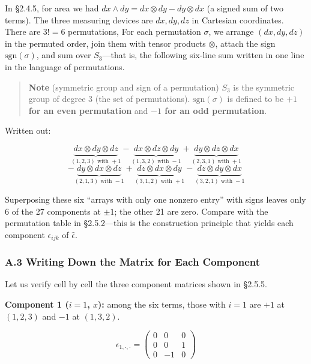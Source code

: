 \documentclass[a4paper,12pt,openany]{book}
\begin{document}
In §2.4.5, for area we had
\(dx \wedge dy = dx \otimes dy - dy \otimes dx\) (a signed sum of two
terms). The three measuring devices are \(dx, dy, dz\) in Cartesian
coordinates. There are \(3! = 6\) permutations, For each permutation
\(\sigma\), we arrange \((dx,dy,dz)\) in the permuted order, join them
with tensor products \(\otimes\), attach the sign
\(\mathrm{sgn}(\sigma)\), and sum over \(S_3\)—that is, the following
six-line sum written in one line in the language of permutations.

\begin{quote}
\textbf{Note} (symmetric group and sign of a permutation) \(S_3\) is the
symmetric group of degree 3 (the set of permutations).
\(\mathrm{sgn}(\sigma)\) is defined to be
\textbf{$+1$ for an even permutation} and
\textbf{$-1$ for an odd permutation}.
\end{quote}

Written out:

\[\underbrace{dx \otimes dy \otimes dz}_{(1,2,3)\text{ with }+1} - \underbrace{dx \otimes dz \otimes dy}_{(1,3,2)\text{ with }-1} + \underbrace{dy \otimes dz \otimes dx}_{(2,3,1)\text{ with }+1}\]
\[- \underbrace{dy \otimes dx \otimes dz}_{(2,1,3)\text{ with }-1} + \underbrace{dz \otimes dx \otimes dy}_{(3,1,2)\text{ with }+1} - \underbrace{dz \otimes dy \otimes dx}_{(3,2,1)\text{ with }-1}\]

Superposing these six ``arrays with only one nonzero entry'' with signs
leaves only 6 of the 27 components at \(\pm 1\); the other 21 are zero.
Compare with the permutation table in §2.5.2—this is the construction
principle that yields each component \(\epsilon_{ijk}\) of
\(\widehat{\epsilon}\).

\hypertarget{a.3-writing-down-the-matrix-for-each-component}{%
\subsubsection*{A.3 Writing Down the Matrix for Each
Component}\label{a.3-writing-down-the-matrix-for-each-component}}

Let us verify cell by cell the three component matrices shown in §2.5.5.

\textbf{Component 1 (\(i=1\), \(x\)):} among the six terms, those with
\(i = 1\) are \(+1\) at \((1,2,3)\) and \(-1\) at \((1,3,2)\).

\[\epsilon_{1,\cdot,\cdot} = \begin{pmatrix} 0 & 0 & 0 \\ 0 & 0 & 1 \\ 0 & -1 & 0 \end{pmatrix}\]
\end{document}
